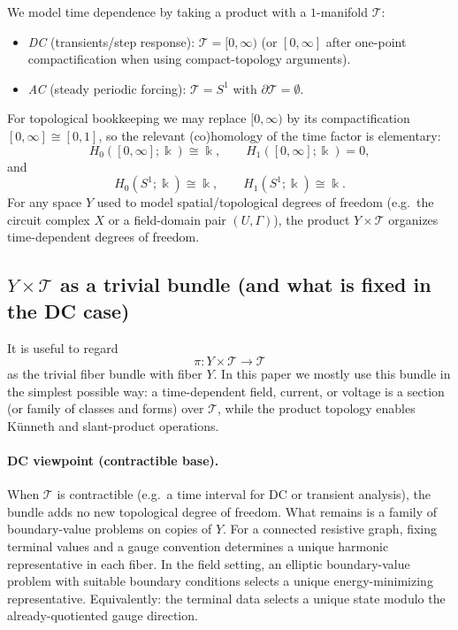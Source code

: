 \documentclass[11pt]{article}
\begin{document}
We model time dependence by taking a product with a $1$-manifold $\mathcal{T}$:
\begin{itemize}
  \item \emph{DC} (transients/step response): $\mathcal{T}=[0,\infty)$ (or $[0,\infty]$ after one-point compactification when using compact-topology arguments).
  \item \emph{AC} (steady periodic forcing): $\mathcal{T}=S^1$ with $\partial \mathcal{T}=\emptyset$.
\end{itemize}
For topological bookkeeping we may replace $[0,\infty)$ by its compactification $[0,\infty]\cong [0,1]$, so the relevant (co)homology of the time factor is elementary:
\[
H_0([0,\infty];\Bbbk)\cong \Bbbk,\qquad H_1([0,\infty];\Bbbk)=0,
\]
and
\[
H_0(S^1;\Bbbk)\cong \Bbbk,\qquad H_1(S^1;\Bbbk)\cong \Bbbk.
\]
For any space $Y$ used to model spatial/topological degrees of freedom (e.g.\ the circuit complex $X$ or a field-domain pair $(U,\Gamma)$), the product $Y\times \mathcal{T}$ organizes time-dependent degrees of freedom.

\subsection{\texorpdfstring{$Y\times \mathcal{T}$ as a trivial bundle (and what is fixed in the DC case)}{YxTime as a trivial bundle (and what is fixed in the DC case)}}
\label{sec:bundle-viewpoint}
It is useful to regard
\[
\pi\colon Y\times \mathcal{T}\to \mathcal{T}
\]
as the trivial fiber bundle with fiber $Y$.
In this paper we mostly use this bundle in the simplest possible way: a time-dependent field, current, or voltage is a section (or family of classes and forms) over $\mathcal{T}$, while the product topology enables K\"unneth and slant-product operations.

\paragraph{DC viewpoint (contractible base).}
When $\mathcal{T}$ is contractible (e.g.\ a time interval for DC or transient analysis), the bundle adds no new topological degree of freedom.
What remains is a family of boundary-value problems on copies of $Y$.
For a connected resistive graph, fixing terminal values and a gauge convention determines a unique harmonic representative in each fiber.
In the field setting, an elliptic boundary-value problem with suitable boundary conditions selects a unique energy-minimizing representative.
Equivalently: the terminal data selects a unique state modulo the already-quotiented gauge direction.
\end{document}

